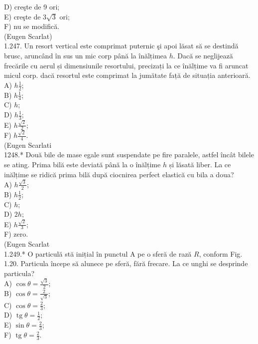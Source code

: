 \documentclass[10pt]{article}
\begin{document}
D) creşte de 9 ori;\\
E) creşte de $3 \sqrt{3}$ ori;\\
F) nu se modifică.\\
(Eugen Scarlat)\\
1.247. Un resort vertical este comprimat puternic şi apoi lăsat să se destindă brusc, aruncând în sus un mic corp până la înălțimea $h$. Dacă se neglijează frecările cu aerul și dimensiunile resortului, precizați la ce înălțime va fi aruncat micul corp. dacă resortul este comprimat la jumătate față de situația anterioară.\\
A) $h \frac{1}{2}$;\\
B) $h \frac{1}{4}$;\\
C) $h$;\\
D) $h \frac{1}{3}$;\\
E) $h \frac{\sqrt{2}}{2}$;\\
F) $h \frac{\sqrt{2}}{4}$.\\
(Eugen Scarlati\\
1248.* Două bile de mase egale sunt suspendate pe fire paralele, astfel încât bilele se ating. Prima bilă este deviată până la o înălțime $h$ și lăsată liber. La ce inălțime se ridică prima bilă după ciocnirea perfect elastică cu bila a doua?\\
A) $h \frac{\sqrt{3}}{2}$;\\
B) $h \frac{1}{2}$;\\
C) $h$;\\
D) $2 h$;\\
E) $h \frac{\sqrt{2}}{3}$;\\
F) zero.\\
(Eugen Scarlat\\
1.249.* O particulă stă inițial în punctul A pe o sferă de rază $R$, conform Fig. 1.20. Particula începe să alunece pe sferă, fără frecare. La ce unghi se desprinde particula?\\
A) $\cos \theta=\frac{\sqrt{3}}{2}$;\\
B) $\cos \theta=\frac{2}{\sqrt{3}}$;\\
C) $\cos \theta=\frac{2}{3}$;\\
D) $\operatorname{tg} \theta=\frac{1}{2}$;\\
E) $\sin \theta=\frac{2}{3}$;\\
F) $\operatorname{tg} \theta=\frac{2}{3}$.
\end{document}
